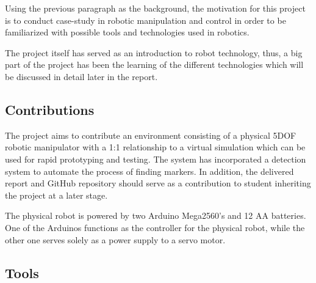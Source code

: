\documentclass[11pt,a4paper, titlepage]{article}
\begin{document}
Using the previous paragraph as the background, the motivation for this project is to conduct case-study in robotic manipulation and control in order to be familiarized with possible tools and technologies used in robotics.

The project itself has served as an introduction to robot technology, thus, a big part of the project has been the learning of the different technologies which will be discussed in detail later in the report.

\subsection{Contributions}
The project aims to contribute an environment consisting of a physical 5DOF robotic manipulator with a 1:1 relationship to a virtual simulation which can be used for rapid prototyping and testing. The system has incorporated a detection system to automate the process of finding markers. In addition, the delivered report and GitHub repository should serve as a contribution to student inheriting the project at a later stage.

The physical robot is powered by two Arduino Mega2560's and 12 AA batteries. One of the Arduinos functions as the controller for the physical robot, while the other one serves solely as a power supply to a servo motor.

\subsection{Tools}
\end{document}
